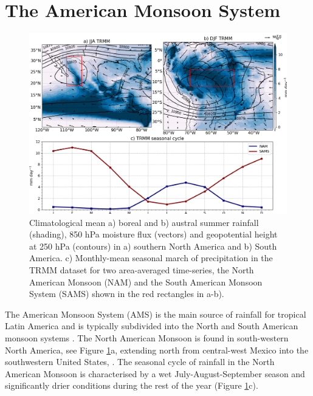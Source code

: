 \section{The American Monsoon System}\label{sq:bk_ams}

\begin{figure}[t!]
\includegraphics[width=\linewidth]{figures/amsclim.png}
\caption{ Climatological mean a) boreal and b) austral summer rainfall (shading), 850 hPa moisture flux (vectors) and geopotential height at 250 hPa (contours) in a) southern North America and b) South America. c) Monthly-mean seasonal march of precipitation in the TRMM dataset for two area-averaged time-series, the North American Monsoon (NAM) and the South American Monsoon System (SAMS) shown in the red rectangles in a-b). }
\label{fig:americanmonsoon}
\end{figure}

The American Monsoon System (AMS) is the main source of rainfall for tropical Latin America and is typically subdivided into the North and South American monsoon systems \citep{vera2006}.
The North American Monsoon is found in south-western North America, see Figure \ref{fig:americanmonsoon}a, extending north from central-west Mexico into the southwestern United States, \citep{adams1997,stensrud1997,vera2006}.
 The seasonal cycle of rainfall in the North American Monsoon is characterised by a wet July-August-September season and significantly drier conditions during the rest of the year \citep{adams1997} (Figure \ref{fig:americanmonsoon}c).



